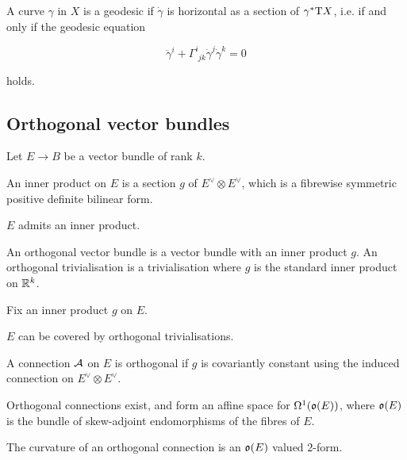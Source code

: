 \begin{definition}
    [geodesic] A curve \(\gamma\) in \(X\) is a geodesic if \(\dot\gamma\) is horizontal as a section of \(\gamma^* \mathrm{T} X\), i.e. if and only if the geodesic equation

    \[\ddot\gamma^i + \Gamma^i_{\phantom ijk}\dot\gamma^j\dot\gamma^k = 0\]

    holds.
\end{definition}

\subsection{Orthogonal vector bundles}

Let \(E \to B\) be a vector bundle of rank \(k\).

\begin{definition}
     An inner product on \(E\) is a section \(g\) of \(E^\vee \otimes E^\vee\), which is a fibrewise symmetric positive definite bilinear form.
\end{definition}

\begin{lemma}
    \(E\) admits an inner product.
\end{lemma}

\begin{definition}
     An orthogonal vector bundle is a vector bundle with an inner product \(g\). An orthogonal trivialisation is a trivialisation where \(g\) is the standard inner product on \(\mathbb{R}^k\).
\end{definition}

Fix an inner product \(g\) on \(E\).

\begin{lemma}
    \(E\) can be covered by orthogonal trivialisations.
\end{lemma}

\begin{definition}
     A connection \(\mathcal{A}\) on \(E\) is orthogonal if \(g\) is covariantly constant using the induced connection on \(E^\vee \otimes E^\vee\).
\end{definition}

\begin{lemma}
    Orthogonal connections exist, and form an affine space for \(\Omega^1(\mathfrak{o}(E))\), where \(\mathfrak{o}(E)\) is the bundle of skew-adjoint endomorphisms of the fibres of \(E\).
\end{lemma}

\begin{lemma}
    The curvature of an orthogonal connection is an \(\mathfrak{o}(E)\) valued \(2\)-form.
\end{lemma}
